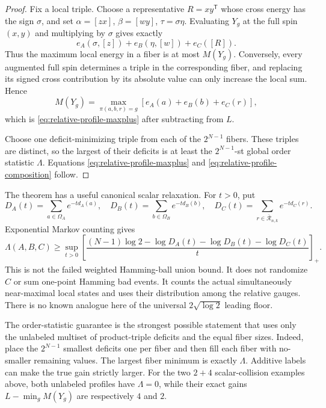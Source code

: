 \documentclass[11pt]{article}
\begin{document}
\begin{proof}
Fix a local triple.  Choose a representative $R=xy^{\mathsf T}$ whose
cross energy has the sign $\sigma$, and set
$\alpha=[zx]$, $\beta=[wy]$, $\tau=\sigma\eta$.  Evaluating $Y_g$ at
the full spin $(x,y)$ and multiplying by $\sigma$ gives exactly
\[
 e_A(\sigma,[z])+e_B(\eta,[w])+e_C([R]).
\]
Thus the maximum local energy in a fiber is at most $M(Y_g)$.  Conversely,
every augmented full spin determines a triple in the corresponding fiber,
and replacing its signed cross contribution by its absolute value can only
increase the local sum.  Hence
\[
 M(Y_g)=\max_{\pi(a,b,r)=g}[e_A(a)+e_B(b)+e_C(r)],
\]
which is \eqref{eq:relative-profile-maxplus} after subtracting from $L$.

Choose one deficit-minimizing triple from each of the $2^{N-1}$ fibers.
These triples are distinct, so the largest of their deficits is at least the
$2^{N-1}$-st global order statistic $\Lambda$.  Equations
\eqref{eq:relative-profile-maxplus} and
\eqref{eq:relative-profile-composition} follow.
\end{proof}

The theorem has a useful canonical scalar relaxation.  For $t>0$, put
\[
 D_A(t)=\sum_{a\in\Omega_A}e^{-td_A(a)},\quad
 D_B(t)=\sum_{b\in\Omega_B}e^{-td_B(b)},\quad
 D_C(t)=\sum_{r\in\overline{\mathcal R}_{n,k}}e^{-td_C(r)}.
\]
Exponential Markov counting gives
\begin{equation}
 \Lambda(A,B,C)\ge
 \sup_{t>0}\left[
 \frac{(N-1)\log2-\log D_A(t)-\log D_B(t)-\log D_C(t)}{t}
 \right]_+.
 \label{eq:relative-profile-variational}
\end{equation}
This is not the failed weighted Hamming-ball union bound.  It does not
randomize $C$ or sum one-point Hamming bad events.  It counts the actual
simultaneously near-maximal local states and uses their distribution among
the relative gauges.  There is no known analogue here of the universal
$2\sqrt{\log2}$ leading floor.

The order-statistic guarantee is the strongest possible statement that uses
only the unlabeled multiset of product-triple deficits and the equal fiber
sizes.  Indeed, place the $2^{N-1}$ smallest deficits one per fiber and then
fill each fiber with no-smaller remaining values.  The largest fiber minimum
is exactly $\Lambda$.  Additive labels can make the true gain strictly
larger.  For the two $2+4$ scalar-collision examples above, both unlabeled
profiles have $\Lambda=0$, while their exact gains $L-\min_gM(Y_g)$ are
respectively $4$ and $2$.
\end{document}
